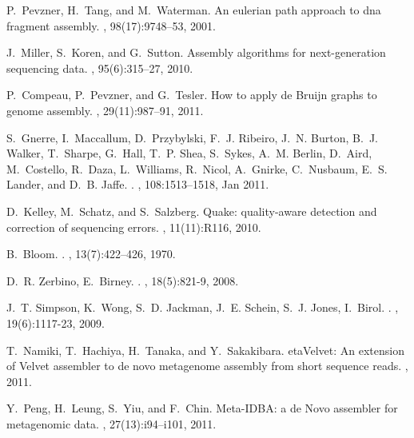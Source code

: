 \documentclass{pnastwo}
\begin{document}
\begin{article}
\begin{thebibliography}{10}
P.~Pevzner, H.~Tang, and M.~Waterman.
\newblock An eulerian path approach to dna fragment assembly.
, 98(17):9748--53, 2001.

J.~Miller, S.~Koren, and G.~Sutton.
\newblock Assembly algorithms for next-generation sequencing data.
, 95(6):315--27, 2010.

P.~Compeau, P.~Pevzner, and G.~Tesler.
\newblock How to apply de {B}ruijn graphs to genome assembly.
, 29(11):987--91, 2011.

S.~Gnerre, I.~Maccallum, D.~Przybylski, F.~J. Ribeiro, J.~N. Burton, B.~J.
  Walker, T.~Sharpe, G.~Hall, T.~P. Shea, S.~Sykes, A.~M. Berlin, D.~Aird,
  M.~Costello, R.~Daza, L.~Williams, R.~Nicol, A.~Gnirke, C.~Nusbaum, E.~S.
  Lander, and D.~B. Jaffe.
.
, 108:1513--1518, Jan 2011.

D.~Kelley, M.~Schatz, and S.~Salzberg.
\newblock Quake: quality-aware detection and correction of sequencing errors.
, 11(11):R116, 2010.

B.~Bloom.
.
, 13(7):422--426, 1970.

D.~R. Zerbino, E.~Birney.
.
, 18(5):821-9, 2008.

J.~T. Simpson, K.~Wong, S.~D. Jackman, J.~E. Schein, S.~J. Jones, I.~Birol.
.
, 19(6):1117-23, 2009.

T.~Namiki, T.~Hachiya, H.~Tanaka, and Y.~Sakakibara.
eta{V}elvet: {A}n extension of {V}elvet assembler to de novo
  metagenome assembly from short sequence reads.
, 2011.

Y.~Peng, H.~Leung, S.~Yiu, and F.~Chin.
\newblock Meta-IDBA: a de Novo assembler for metagenomic data.
, 27(13):i94--i101, 2011.


\end{thebibliography}
\end{article}
\end{document}
